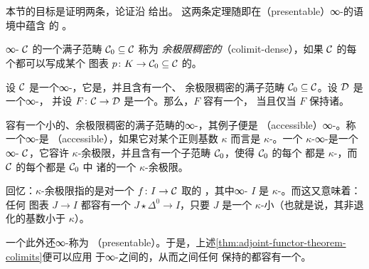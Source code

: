 \section{\trAdjointFunctorTheorem{}}
\label{sec:adjoint-functor-theorems}

本节的目标是证明两条\trAdjointFunctorTheorem{}，论证沿 \cite{NRS19} 给出。
这两条定理随即在\trPresentable{}（presentable）∞-\trCategories{}的语境中蕴含%
\trLurie{}的\trAdjointFunctorTheorem{} \cite{Lur09}。

\begin{definition}\label{def:colimit-dense}
∞-\trCategory{} $\mathcal{C}$ 的一个满子范畴 $\mathcal{C}_0 \subseteq \mathcal{C}$ 称为%
\emph{余极限稠密的}（colimit-dense），如果 $\mathcal{C}$ 的每个\trObject{}都可以写成某个
图表 $p\colon K \to \mathcal{C}_0 \subseteq \mathcal{C}$ 的\trColimit{}。
\end{definition}

\begin{theorem}\label{thm:adjoint-functor-theorem-colimits}
设 $\mathcal{C}$ 是一个\trLocallySmall{}∞-\trCategory{}，它是\trCocomplete{}，并且含有一个\trEssentiallySmall{}、
余极限稠密的满子范畴 $\mathcal{C}_0 \subseteq \mathcal{C}$。设 $\mathcal{D}$ 是一个\trLocallySmall{}∞-\trCategory{}，
并设 $F\colon \mathcal{C} \to \mathcal{D}$ 是一个\trFunctor{}。那么，$F$ 容有一个\trRightAdjoint{}，
当且仅当 $F$ 保持诸\trColimit{}。
\end{theorem}

\begin{remark}\label{rem:accessible-categories}
容有一个小的、余极限稠密的满子范畴的\trLocallySmall{}∞-\trCategories{}，其例子便是%
\trAccessible{}（accessible）∞-\trCategories{}。称一个∞-\trCategory{}是\emph{\trAccessible{}}%
（accessible），如果它对某个正则基数 $\kappa$ 而言是 $\kappa$-\trAccessible{}。一个
$\kappa$-\trAccessible{}∞-\trCategory{}是一个\trLocallySmall{}∞-\trCategory{} $\mathcal{C}$，它容许
$\kappa$-\trFiltered{}余极限，并且含有一个\trEssentiallySmall{}子范畴 $\mathcal{C}_0$，使得 $\mathcal{C}_0$ 的每个%
\trObject{}都是 $\kappa$-\trCompact{}，而 $\mathcal{C}$ 的每个\trObject{}都是 $\mathcal{C}_0$ 中
诸\trObject{}的一个 $\kappa$-\trFiltered{}余极限。

回忆：$\kappa$-\trFiltered{}余极限指的是对一个\trFunctor{} $f\colon I \to \mathcal{C}$ 取的%
\trColimit{}，其中∞-\trCategory{} $I$ 是 $\kappa$-\trFiltered{}。而这又意味着：任何
图表 $J \to I$ 都容有一个\trCone{} $J \star \Delta^0 \to I$，只要 $J$ 是一个
$\kappa$-小\trSimplicialSet{}（也就是说，其非退化\trSimplex{}的基数小于
$\kappa$）。
\end{remark}

\begin{remark}\label{rem:presentable}
一个此外还\trCocomplete{}\trAccessible{}∞-\trCategory{}称为\emph{\trPresentable{}}%
（presentable）。于是，上述\cref{thm:adjoint-functor-theorem-colimits}便可以应用
于\trPresentable{}∞-\trCategories{}之间的\trFunctor{}，从而\trPresentable{}\trCategories{}之间任何
保持\trColimit{}的\trFunctor{}都容有一个\trRightAdjoint{}。
\end{remark}


